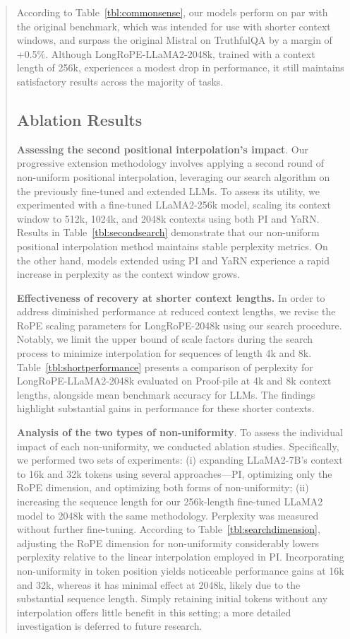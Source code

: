 \begin{abstract}
According to Table~\ref{tbl:commonsense}, our models perform on par with the original benchmark, which was intended for use with shorter context windows, and surpass the original Mistral on TruthfulQA by a margin of +0.5\%. Although LongRoPE-LLaMA2-2048k, trained with a context length of 256k, experiences a modest drop in performance, it still maintains satisfactory results across the majority of tasks.

\subsection{Ablation Results}

\textbf{Assessing the second positional interpolation's impact}. Our progressive extension methodology involves applying a second round of non-uniform positional interpolation, leveraging our search algorithm on the previously fine-tuned and extended LLMs. To assess its utility, we experimented with a fine-tuned LLaMA2-256k model, scaling its context window to 512k, 1024k, and 2048k contexts using both PI and YaRN. Results in Table~\ref{tbl:secondsearch} demonstrate that our non-uniform positional interpolation method maintains stable perplexity metrics. On the other hand, models extended using PI and YaRN experience a rapid increase in perplexity as the context window grows.

\textbf{Effectiveness of recovery at shorter context lengths.} In order to address diminished performance at reduced context lengths, we revise the RoPE scaling parameters for LongRoPE-2048k using our search procedure. Notably, we limit the upper bound of scale factors during the search process to minimize interpolation for sequences of length 4k and 8k. Table~\ref{tbl:shortperformance} presents a comparison of perplexity for LongRoPE-LLaMA2-2048k evaluated on Proof-pile at 4k and 8k context lengths, alongside mean benchmark accuracy for LLMs. The findings highlight substantial gains in performance for these shorter contexts.

\textbf{Analysis of the two types of non-uniformity}. To assess the individual impact of each non-uniformity, we conducted ablation studies. Specifically, we performed two sets of experiments: (i) expanding LLaMA2-7B's context to 16k and 32k tokens using several approaches—PI, optimizing only the RoPE dimension, and optimizing both forms of non-uniformity; (ii) increasing the sequence length for our 256k-length fine-tuned LLaMA2 model to 2048k with the same methodology. Perplexity was measured without further fine-tuning. According to Table~\ref{tbl:searchdimension}, adjusting the RoPE dimension for non-uniformity considerably lowers perplexity relative to the linear interpolation employed in PI. Incorporating non-uniformity in token position yields noticeable performance gains at 16k and 32k, whereas it has minimal effect at 2048k, likely due to the substantial sequence length. Simply retaining initial tokens without any interpolation offers little benefit in this setting; a more detailed investigation is deferred to future research.


\end{abstract}
